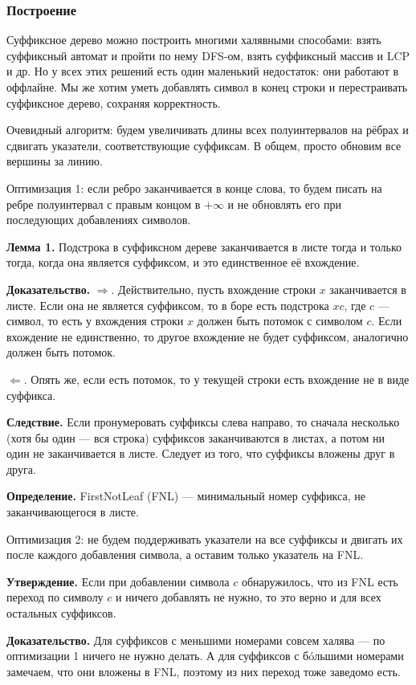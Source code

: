 \subsubsection{Построение}
Суффиксное дерево можно построить многими халявными способами: взять суффиксный автомат и пройти по нему DFS-ом, взять суффиксный массив и LCP и др.
Но у всех этих решений есть один маленький недостаток: они работают в оффлайне.
Мы же хотим уметь добавлять символ в конец строки и перестраивать суффиксное дерево, сохраняя корректность.

Очевидный алгоритм: будем увеличивать длины всех полуинтервалов на рёбрах и сдвигать указатели, соответствующие суффиксам.
В общем, просто обновим все вершины за линию.

Оптимизация 1: если ребро заканчивается в конце слова, то будем писать на ребре полуинтервал с правым концом в $+\infty$ и не обновлять его при последующих добавлениях символов.

\textbf{Лемма 1.} Подстрока в суффиксном дереве заканчивается в листе тогда и только тогда, когда она является суффиксом, и это единственное её вхождение.

\textbf{Доказательство.} $\Rightarrow$. Действительно, пусть вхождение строки $x$ заканчивается в листе.
Если она не является суффиксом, то в боре есть подстрока $xc$, где $c$ --- символ, то есть у вхождения строки $x$ должен быть потомок с символом $c$.
Если вхождение не единственно, то другое вхождение не будет суффиксом, аналогично должен быть потомок.

$\Leftarrow$. Опять же, если есть потомок, то у текущей строки есть вхождение не в виде суффикса.

\textbf{Следствие.} Если пронумеровать суффиксы слева направо, то сначала несколько (хотя бы один --- вся строка) суффиксов заканчиваются в листах, а потом ни один не заканчивается в листе.
Следует из того, что суффиксы вложены друг в друга.

\textbf{Определение.} FirstNotLeaf (FNL) --- минимальный номер суффикса, не заканчивающегося в листе.

Оптимизация 2: не будем поддерживать указатели на все суффиксы и двигать их после каждого добавления символа, а оставим только указатель на FNL.

\textbf{Утверждение.} Если при добавлении символа $c$ обнаружилось, что из FNL есть переход по символу $c$ и ничего добавлять не нужно, то это верно и для всех остальных суффиксов.

\textbf{Доказательство.} Для суффиксов с меньшими номерами совсем халява --- по оптимизации 1 ничего не нужно делать.
А для суффиксов с бóльшими номерами замечаем, что они вложены в FNL, поэтому из них переход тоже заведомо есть.


